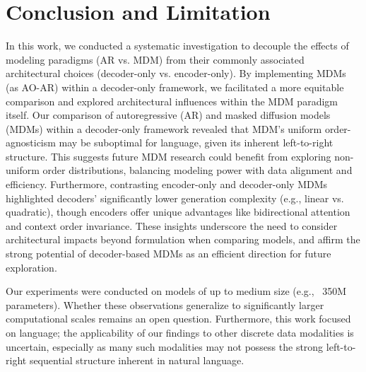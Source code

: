 \section{Conclusion and Limitation}
In this work, we conducted a systematic investigation to decouple the effects of modeling paradigms (AR vs. MDM) from their commonly associated architectural choices (decoder-only vs. encoder-only). By implementing MDMs (as AO-AR) within a decoder-only framework, we facilitated a more equitable comparison and explored architectural influences within the MDM paradigm itself.
Our comparison of autoregressive (AR) and masked diffusion models (MDMs) within a decoder-only framework revealed that MDM's uniform order-agnosticism may be suboptimal for language, given its inherent left-to-right structure. This suggests future MDM research could benefit from exploring non-uniform order distributions, balancing modeling power with data alignment and efficiency. Furthermore, contrasting encoder-only and decoder-only MDMs highlighted decoders' significantly lower generation complexity (e.g., linear vs. quadratic), though encoders offer unique advantages like bidirectional attention and context order invariance. These insights underscore the need to consider architectural impacts beyond formulation when comparing models, and affirm the strong potential of decoder-based MDMs as an efficient direction for future exploration.

Our experiments were conducted on models of up to medium size (e.g., ~350M parameters). Whether these observations generalize to significantly larger computational scales remains an open question. Furthermore, this work focused on language; the applicability of our findings to other discrete data modalities is uncertain, especially as many such modalities may not possess the strong left-to-right sequential structure inherent in natural language.

